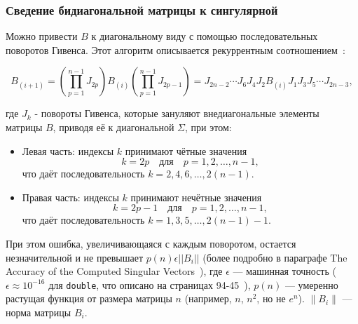 \subsubsection{Сведение бидиагональной матрицы к сингулярной}

Можно привести $B$ к диагональному виду с помощью последовательных поворотов Гивенса. Этот алгоритм описывается рекуррентным соотношением~\cite{Demmel1990}:

\begin{equation}
B_{(i+1)} = \left( \prod_{p=1}^{n-1} J_{2p} \right) B_{(i)} \left( \prod_{p=1}^{n-1} J_{2p-1} \right) = J_{2n-2} \cdots J_6 J_4 J_2 B_{(i)} J_1 J_3 J_5 \cdots J_{2n-3},
\end{equation}

где \( J_k \) - повороты Гивенса, которые зануляют внедиагональные элементы матрицы \( B \), приводя её к диагональной \( \Sigma \), при этом:
\begin{itemize}
    \item Левая часть: индексы $k$ принимают чётные значения
    \begin{equation}
    k = 2p \quad \text{для} \quad p = 1,2,\ldots,n-1,
    \end{equation}
    что даёт последовательность $k = 2,4,6,\ldots,2(n-1)$.

    \item Правая часть: индексы $k$ принимают нечётные значения
    \begin{equation}
    k = 2p-1 \quad \text{для} \quad p = 1,2,\ldots,n-1,
    \end{equation}
    что даёт последовательность $k = 1,3,5,\ldots,2(n-1)-1$.
\end{itemize}

При этом ошибка, увеличивающаяся с каждым поворотом, остается незначительной и не превышает $p(n) \epsilon ||B_i||$ (более подробно в параграфе The Accuracy of the Computed Singular Vectors~\cite{Demmel1990}), где  \( \epsilon \) — машинная точность (\( \epsilon \approx 10^{-16} \) для \texttt{double}, что описано на страницах 94-45~\cite{Golub2013}), \( p(n) \) — умеренно растущая функция от размера матрицы \( n \) (например, \( n \), \( n^2 \), но не \( e^n \)). \( \|B_i\| \) — норма матрицы \( B_i \).

